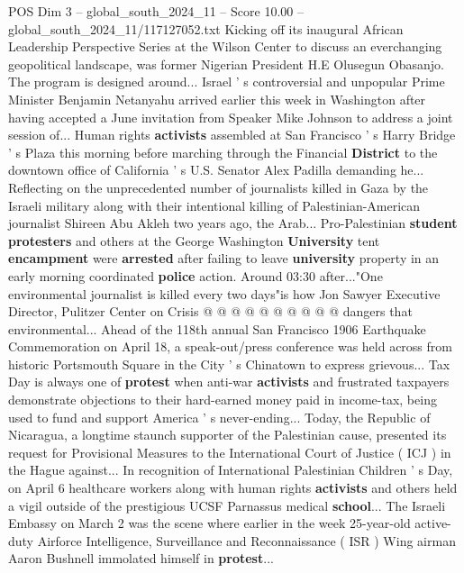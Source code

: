 \begin{textsample}{POS Dim 3 – global\_south\_2024\_11 – Score 10.00 – global\_south\_2024\_11/117127052.txt}  \label{ex:f3_pos_303}
Kicking off its inaugural African Leadership Perspective Series at the Wilson Center to discuss an everchanging geopolitical landscape, was former Nigerian President H.E Olusegun Obasanjo.
The program is designed around...
Israel ' s controversial and unpopular Prime Minister Benjamin Netanyahu arrived earlier this week in Washington after having accepted a June invitation from Speaker Mike Johnson to address a joint session of...
Human rights \textbf{activists} assembled at San Francisco ' s Harry Bridge ' s Plaza this morning before marching through the Financial \textbf{District} to the downtown office of California ' s U.S.
Senator Alex Padilla demanding he...
Reflecting on the unprecedented number of journalists killed in Gaza by the Israeli military along with their intentional killing of Palestinian-American journalist Shireen Abu Akleh two years ago, the Arab...
Pro-Palestinian \textbf{student} \textbf{protesters} and others at the George Washington \textbf{University} tent \textbf{encampment} were \textbf{arrested} after failing to leave \textbf{university} property in an early morning coordinated \textbf{police} action.
Around 03:30 after..."One environmental journalist is killed every two days"is how Jon Sawyer Executive Director, Pulitzer Center on Crisis @ @ @ @ @ @ @ @ @ @ dangers that environmental...
Ahead of the 118th annual San Francisco 1906 Earthquake Commemoration on April 18, a speak-out/press conference was held across from historic Portsmouth Square in the City ' s Chinatown to express grievous...
Tax Day is always one of \textbf{protest} when anti-war \textbf{activists} and frustrated taxpayers demonstrate objections to their hard-earned money paid in income-tax, being used to fund and support America ' s never-ending...
Today, the Republic of Nicaragua, a longtime staunch supporter of the Palestinian cause, presented its request for Provisional Measures to the International Court of Justice ( ICJ ) in the Hague against...
In recognition of International Palestinian Children ' s Day, on April 6 healthcare workers along with human rights \textbf{activists} and others held a vigil outside of the prestigious UCSF Parnassus medical \textbf{school}...
The Israeli Embassy on March 2 was the scene where earlier in the week 25-year-old active-duty Airforce Intelligence, Surveillance and Reconnaissance ( ISR ) Wing airman Aaron Bushnell immolated himself in \textbf{protest}...

\end{textsample}
